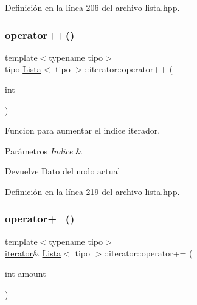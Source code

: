 Definición en la línea 206 del archivo lista.\+hpp.

\mbox{\label{classLista_1_1iterator_ac9059ed8e1f396ec967ae97b571d11fe}} 
\subsubsection{\texorpdfstring{operator++()}{operator++()}\hspace{0.1cm}{\footnotesize\ttfamily [2/2]}}
{\footnotesize\ttfamily template$<$typename tipo$>$ \\
tipo \hyperlink{classLista}{Lista}$<$ tipo $>$\+::iterator\+::operator++ (\begin{DoxyParamCaption}\item[{int}]{ }\end{DoxyParamCaption})\hspace{0.3cm}{\ttfamily [inline]}}



Funcion para aumentar el indice iterador. 


\begin{DoxyParams}{Parámetros}
{\em Indice} & \\
\hline
\end{DoxyParams}
\begin{DoxyReturn}{Devuelve}
Dato del nodo actual 
\end{DoxyReturn}


Definición en la línea 219 del archivo lista.\+hpp.

\mbox{\label{classLista_1_1iterator_a99315852e99d13cfac11f570917ac092}} 
\subsubsection{\texorpdfstring{operator+=()}{operator+=()}}
{\footnotesize\ttfamily template$<$typename tipo$>$ \\
\hyperlink{classLista_1_1iterator}{iterator}\& \hyperlink{classLista}{Lista}$<$ tipo $>$\+::iterator\+::operator+= (\begin{DoxyParamCaption}\item[{int}]{amount }\end{DoxyParamCaption})\hspace{0.3cm}{\ttfamily [inline]}}



